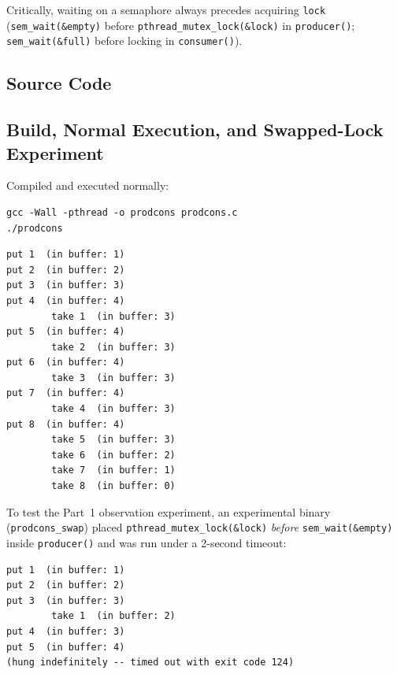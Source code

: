\documentclass[12pt,a4paper]{article}
\begin{document}
Critically, waiting on a semaphore always precedes acquiring \texttt{lock} (\texttt{sem\_\allowbreak wait(\&empty)} before \texttt{pthread\_\allowbreak mutex\_\allowbreak lock(\&lock)} in \texttt{producer()}; \texttt{sem\_\allowbreak wait(\&full)} before locking in \texttt{consumer()}).

\subsection{Source Code}


\subsection{Build, Normal Execution, and Swapped-Lock Experiment}
Compiled and executed normally:
\begin{lstlisting}[style=bashstyle]
gcc -Wall -pthread -o prodcons prodcons.c
./prodcons
\end{lstlisting}

\begin{lstlisting}[style=consolestyle, caption={Observed output of \texttt{./prodcons} (exited cleanly with code \texttt{0})}]
put 1  (in buffer: 1)
put 2  (in buffer: 2)
put 3  (in buffer: 3)
put 4  (in buffer: 4)
        take 1  (in buffer: 3)
put 5  (in buffer: 4)
        take 2  (in buffer: 3)
put 6  (in buffer: 4)
        take 3  (in buffer: 3)
put 7  (in buffer: 4)
        take 4  (in buffer: 3)
put 8  (in buffer: 4)
        take 5  (in buffer: 3)
        take 6  (in buffer: 2)
        take 7  (in buffer: 1)
        take 8  (in buffer: 0)
\end{lstlisting}

To test the Part~1 observation experiment, an experimental binary (\texttt{prodcons\_\allowbreak swap}) placed \texttt{pthread\_\allowbreak mutex\_\allowbreak lock(\&lock)} \emph{before} \texttt{sem\_\allowbreak wait(\&empty)} inside \texttt{producer()} and was run under a 2-second timeout:

\begin{lstlisting}[style=consolestyle, caption={Observed output of swapped lock/wait order in \texttt{producer()} (\texttt{timeout 2}: exit code \texttt{124})}]
put 1  (in buffer: 1)
put 2  (in buffer: 2)
put 3  (in buffer: 3)
        take 1  (in buffer: 2)
put 4  (in buffer: 3)
put 5  (in buffer: 4)
(hung indefinitely -- timed out with exit code 124)
\end{lstlisting}
\end{document}
